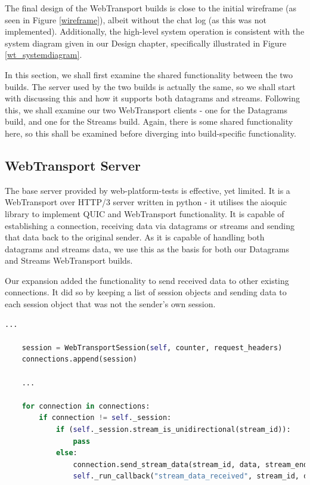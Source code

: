 
The final design of the WebTransport builds is close to the initial wireframe (as seen in Figure \ref{wireframe}), albeit without the chat log (as this was not implemented). Additionally, the high-level system operation is consistent with the system diagram given in our Design chapter, specifically illustrated in Figure \ref{wt_systemdiagram}.

In this section, we shall first examine the shared functionality between the two builds. The server used by the two builds is actually the same, so we shall start with discussing this and how it supports both datagrams and streams. Following this, we shall examine our two WebTransport clients - one for the Datagrams build, and one for the Streams build. Again, there is some shared functionality here, so this shall be examined before diverging into build-specific functionality.

\subsection{WebTransport Server}
The base server provided by web-platform-tests is effective, yet limited. It is a WebTransport over HTTP/3 server written in python - it utilises the aioquic library \cite{aioquic} to implement QUIC and WebTransport functionality. It is capable of establishing a connection, receiving data via datagrams or streams and sending that data back to the original sender. As it is capable of handling both datagrams and streams data, we use this as the basis for both our Datagrams and Streams WebTransport builds.

Our expansion added the functionality to send received data to other existing connections. It did so by keeping a list of session objects and sending data to each session object that was not the sender's own session.

\begin{lstlisting}[language=python, caption={Added server functionality of sending data to other existing connections (streams example).}, label=lst:callahan]
    ...
    
    session = WebTransportSession(self, counter, request_headers)
    connections.append(session)
        
    ...
    
    for connection in connections:
        if connection != self._session:
            if (self._session.stream_is_unidirectional(stream_id)):
                pass
            else:
                connection.send_stream_data(stream_id, data, stream_ended)                    
                self._run_callback("stream_data_received", stream_id, data, stream_ended)

\end{lstlisting}
    
